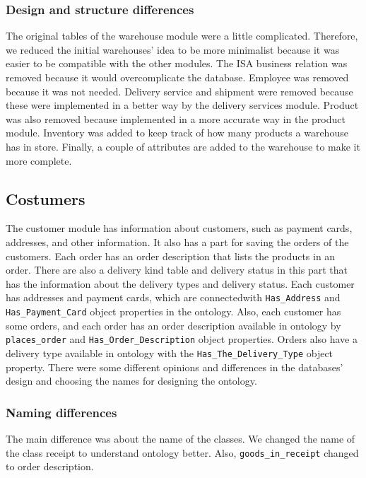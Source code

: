 \documentclass{article}
\begin{document}
\subsubsection{Design and structure differences}
The original tables of the warehouse module were a little complicated. Therefore, we reduced the initial warehouses' idea to be more minimalist because it was easier to be compatible with the other modules. The ISA business relation was removed because it would overcomplicate the database. Employee was removed because it was not needed. Delivery service and shipment were removed because these were implemented in a better way by the delivery services module. Product was also removed because implemented in a more accurate way in the product module. Inventory was added to keep track of how many products a warehouse has in store. Finally, a couple of attributes are added to the warehouse to make it more complete.


\subsection{Costumers}
The customer module has information about customers, such as payment cards, addresses, and other information. It also has a part for saving the orders of the customers. Each order has an order description that lists the products in an order. There are also a delivery kind table and delivery status in this part that has the information about the delivery types and delivery status. Each customer has addresses and payment cards, which are connectedwith \texttt{Has\_Address} and \texttt{Has\_Payment\_Card} object properties in the ontology. Also, each customer has some orders, and each order has an order description available in ontology by \texttt{places\_order} and \texttt{Has\_Order\_Description} object properties. Orders also have a delivery type available in ontology with the \texttt{Has\_The\_Delivery\_Type} object property. There were some different opinions and differences in the databases' design and choosing the names for designing the ontology.

\subsubsection{Naming differences}
The main difference was about the name of the classes. We changed the name of the class receipt to understand ontology better. Also, \texttt{goods\_in\_receipt} changed to order description.
\end{document}

